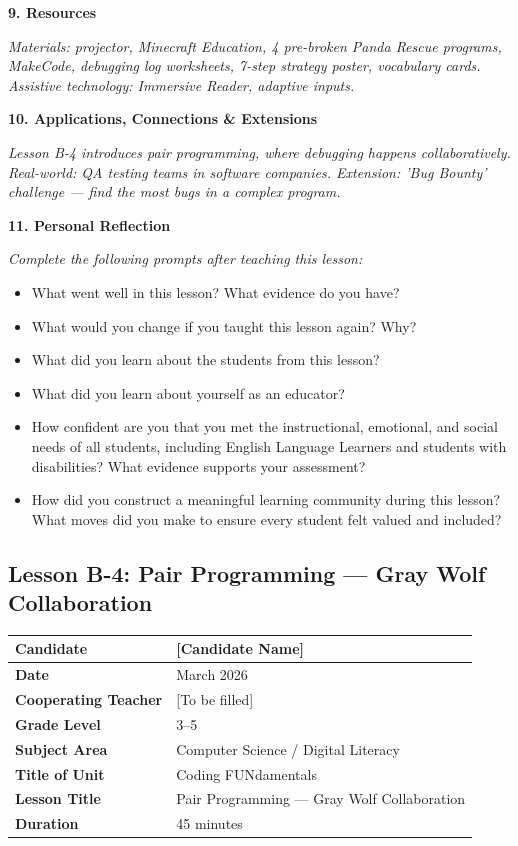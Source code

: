 \documentclass[11pt,letterpaper]{article}
\begin{document}
\textbf{9. Resources}

\textit{Materials: projector, Minecraft Education, 4 pre-broken Panda Rescue programs, MakeCode, debugging log worksheets, 7-step strategy poster, vocabulary cards. Assistive technology: Immersive Reader, adaptive inputs.}

\textbf{10. Applications, Connections \& Extensions}

\textit{Lesson B-4 introduces pair programming, where debugging happens collaboratively. Real-world: QA testing teams in software companies. Extension: 'Bug Bounty' challenge --- find the most bugs in a complex program.}

\textbf{11. Personal Reflection}

\textit{Complete the following prompts after teaching this lesson:}

\begin{itemize}
  \item What went well in this lesson? What evidence do you have?

  \item What would you change if you taught this lesson again? Why?

  \item What did you learn about the students from this lesson?

  \item What did you learn about yourself as an educator?

  \item How confident are you that you met the instructional, emotional, and social needs of all students, including English Language Learners and students with disabilities? What evidence supports your assessment?

  \item How did you construct a meaningful learning community during this lesson? What moves did you make to ensure every student felt valued and included?
\end{itemize}

\newpage
\subsection{Lesson B-4: Pair Programming --- Gray Wolf Collaboration}
\label{sub:LessonB4PairProgrammingGrayWolfCollaboration}

\begin{longtable}{|L{0.28\textwidth}|L{0.65\textwidth}|}
\hline
\textbf{Candidate}  & [Candidate Name]  \\
\hline
\textbf{Date}  & March 2026  \\
\hline
\textbf{Cooperating Teacher}  & [To be filled]  \\
\hline
\textbf{Grade Level}  & 3--5  \\
\hline
\textbf{Subject Area}  & Computer Science / Digital Literacy  \\
\hline
\textbf{Title of Unit}  & Coding FUNdamentals  \\
\hline
\textbf{Lesson Title}  & Pair Programming --- Gray Wolf Collaboration  \\
\hline
\textbf{Duration}  & 45 minutes  \\
\hline
\end{longtable}
\end{document}
